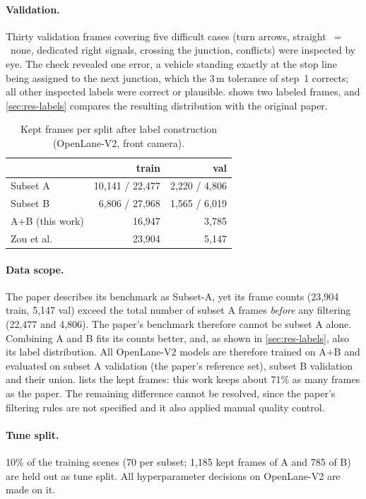 \paragraph{Validation.} Thirty validation frames covering five difficult cases (turn arrows,
straight~$=$~none, dedicated right signals, crossing the junction, conflicts) were inspected by eye.
The check revealed one error, a vehicle standing exactly at the stop line being assigned to the next
junction, which the 3\,m tolerance of step~1 corrects; all other inspected labels were correct or
plausible.  shows two labeled frames, and \cref{sec:res-labels} compares the
resulting distribution with the original paper.

\begin{table}[t]
\centering
\caption{Kept frames per split after label construction (OpenLane-V2, front camera).}
\label{tab:kept-frames}
\begin{tabular}{@{}lrr@{}}
\toprule
 & train & val \\
\midrule
Subset A & 10,141 / 22,477 & 2,220 / 4,806 \\
Subset B & 6,806 / 27,968 & 1,565 / 6,019 \\
A+B (this work) & 16,947 & 3,785 \\
Zou et al.~\cite{zou2026oneperception} & 23,904 & 5,147 \\
\bottomrule
\end{tabular}
\end{table}

\paragraph{Data scope.} The paper describes its benchmark as Subset-A, yet its frame counts (23,904
train, 5,147 val) exceed the total number of subset A frames \emph{before} any filtering (22,477 and
4,806). The paper's benchmark therefore cannot be subset A alone. Combining A and B fits its counts
better, and, as shown in \cref{sec:res-labels}, also its label distribution. All OpenLane-V2 models are
therefore trained on A+B and evaluated on subset A validation (the paper's reference set), subset B
validation and their union.  lists the kept frames: this work keeps about 71\% as
many frames as the paper. The remaining difference cannot be resolved, since the paper's filtering
rules are not specified and it also applied manual quality control.

\paragraph{Tune split.} 10\% of the training scenes (70 per subset; 1,185 kept frames of A and 785 of
B) are held out as tune split. All hyperparameter decisions on OpenLane-V2 are made on it.


